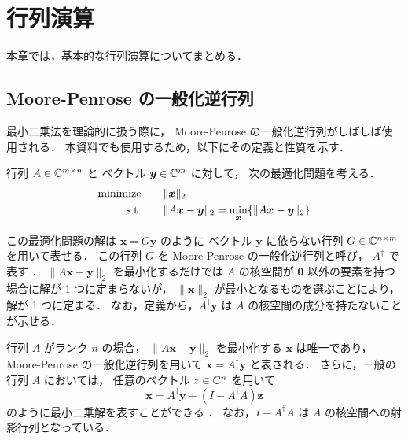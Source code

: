 %

\chapter{行列演算}

本章では，基本的な行列演算についてまとめる．

\section{Moore-Penrose の一般化逆行列}

最小二乗法を理論的に扱う際に，
Moore-Penrose の一般化逆行列がしばしば使用される．
本資料でも使用するため，以下にその定義と性質を示す．

行列 $A \in \mathbb{C}^{m \times n}$ と
ベクトル $\bm{y} \in \mathbb{C}^m$ に対して，
次の最適化問題を考える．
\begin{align}
    \text{minimize} \hspace{2em} & \|\bm{x}\|_2
    \notag                                                                                          \\
    \text{s.t.} \hspace{2em}     & \|A\bm{x}-\bm{y}\|_2 =  \min_{\bm{x}} \{ \|A\bm{x}-\bm{y}\|_2 \}
    \notag
\end{align}

この最適化問題の解は $\bm{x}=G\bm{y}$ のように
ベクトル $\bm{y}$ に依らない行列
$G \in \mathbb{C}^{n \times m}$ を用いて表せる．
この行列 $G$ を Moore-Penrose の一般化逆行列と呼び，
$A^\dagger$ で表す \cite[定義3]{Rao1971}．
$\|A \bm{x} - \bm{y}\|_2$ を最小化するだけでは
$A$ の核空間が $\bm{0}$ 以外の要素を持つ場合に解が 1 つに定まらないが，
$\|\bm{x}\|_2$ が最小となるものを選ぶことにより，
解が 1 つに定まる．
なお，定義から，$A^\dagger \bm{y}$ は $A$ の核空間の成分を持たないことが示せる．

行列 $A$ がランク $n$ の場合，
$\|A \bm{x} - \bm{y}\|_2$ を最小化する $\bm{x}$ は唯一であり，
Moore-Penrose の一般化逆行列を用いて
$\bm{x} = A^\dagger \bm{y}$ と表される．
さらに，一般の行列 $A$ においては，
任意のベクトル $z \in \mathbb{C}^n$ を用いて
\begin{equation}
    \bm{x} = A^\dagger \bm{y} + (I - A^\dagger A) \bm{z}
    \label{eq:matrix-computation_moore-penrose_general-least-squares-solution}
\end{equation}
のように最小二乗解を表すことができる \cite[定理2.3.1]{Rao1971}．
なお，$I - A^\dagger A$ は $A$ の核空間への射影行列となっている．

